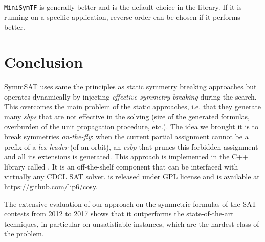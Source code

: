 \texttt{MiniSymTF} is generally better and is the default choice in the library.
If it is running on a specific application, reverse order can be chosen if it performs better.


\section{Conclusion}
SymmSAT uses same the principles as static symmetry breaking approaches but operates dynamically by 
injecting \textit{effective symmetry breaking} during the search.
This overcomes the main problem of the static approaches, i.e. that they
generate many \textit{sbps} that are not effective in the solving (size of the
generated formulas, overburden of the unit propagation procedure, etc.).
The idea we brought it is to break symmetries \emph{on-the-fly}: when the current
partial assignment cannot be a prefix of a \textit{lex-leader} (of an orbit),
an \textit{esbp} that prunes this forbidden assignment and all its extensions is generated. 
This approach is implemented in the C++ library called \libdsb{}. It is an
off-the-shelf component that can be interfaced with virtually any CDCL SAT
solver. \libdsb{} is released under GPL license and is available at
\url{https://github.com/lip6/cosy}.
 
The extensive evaluation of our approach on the symmetric formulas of the 
 SAT contests from 2012 to 2017 shows that it outperforms the state-of-the-art techniques, in
particular on unsatisfiable instances, which are the hardest class of the
problem.